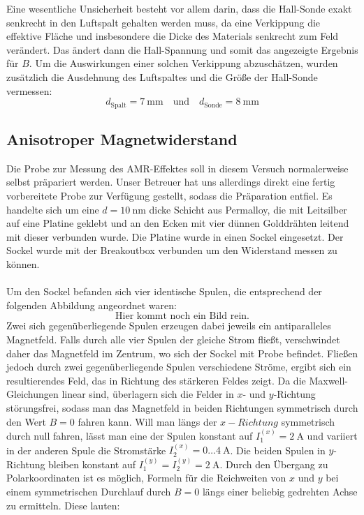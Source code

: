 \documentclass[german,  %
parskip=full,  %
]{scrartcl}
\begin{document}
Eine wesentliche Unsicherheit besteht vor allem darin, dass die Hall-Sonde exakt senkrecht in den Luftspalt gehalten werden muss, da eine Verkippung die effektive Fläche und insbesondere die Dicke des Materials senkrecht zum Feld verändert. Das ändert dann die Hall-Spannung und somit das angezeigte Ergebnis für \(B\). Um die Auswirkungen einer solchen Verkippung abzuschätzen, wurden zusätzlich die Ausdehnung des Luftspaltes und die Größe der Hall-Sonde vermessen:
\[d_{\mathrm{Spalt}} = 7 \ \mathrm{mm} \quad\text{und}\quad d_{\mathrm{Sonde}} = 8 \ \mathrm{mm}\]
\subsection{Anisotroper Magnetwiderstand}
Die Probe zur Messung des AMR-Effektes soll in diesem Versuch normalerweise selbst präpariert werden. Unser Betreuer hat uns allerdings direkt eine fertig vorbereitete Probe zur Verfügung gestellt, sodass die Präparation entfiel. Es handelte sich um eine \(d=10 \ \mathrm{nm}\) dicke Schicht aus Permalloy, die mit Leitsilber auf eine Platine geklebt und an den Ecken mit vier dünnen Golddrähten leitend mit dieser verbunden wurde. Die Platine wurde in einen Sockel eingesetzt. Der Sockel wurde mit der Breakoutbox verbunden um den Widerstand messen zu können. \\\\
Um den Sockel befanden sich vier identische Spulen, die entsprechend der folgenden Abbildung angeordnet waren:
\[\text{Hier kommt noch ein Bild rein.}\]
Zwei sich gegenüberliegende Spulen erzeugen dabei jeweils ein antiparalleles Magnetfeld. Falls durch alle vier Spulen der gleiche Strom fließt, verschwindet daher das Magnetfeld im Zentrum, wo sich der Sockel mit Probe befindet. Fließen jedoch durch zwei gegenüberliegende Spulen verschiedene Ströme, ergibt sich ein resultierendes Feld, das in Richtung des stärkeren Feldes zeigt. Da die Maxwell-Gleichungen linear sind, überlagern sich die Felder in \(x\)- und \(y\)-Richtung störungsfrei, sodass man das Magnetfeld in beiden Richtungen symmetrisch durch den Wert \(B=0\) fahren kann. Will man längs der \(x-Richtung\) symmetrisch durch null fahren, lässt man eine der Spulen konstant auf  \(I_1^{(x)}=2 \ \mathrm{A}\) und variiert in der anderen Spule die Stromstärke \(I_2^{(x)} = 0\hdots 4 \ \mathrm{A}\). Die beiden Spulen in \(y\)-Richtung bleiben konstant auf \(I_1^{(y)} = I_2^{(y)} = 2 \ \mathrm{A}\). Durch den Übergang zu Polarkoordinaten ist es möglich, Formeln für die Reichweiten von \(x\) und \(y\) bei einem symmetrischen Durchlauf durch \(B=0\) längs einer beliebig gedrehten Achse zu ermitteln. Diese lauten:
\end{document}
